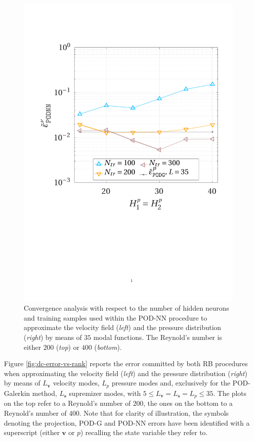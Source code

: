 \documentclass[longtitle]{elsarticle}
\numberwithin{equation}{section}
\theoremstyle{theorem}
\theoremstyle{definition}
\theoremstyle{remark}
\theoremstyle{proposition}
\numberwithin{figure}{section}
\newcommand{\bg}[1]{\boldsymbol{#1}}
\begin{document}
\begin{figure}[h!]
			\includegraphics[scale = 0.37, trim = {1cm 9cm 1.5cm 3.5cm}, clip]{dc_400_p_nn_convergence}
			
			\vspace*{-0.1cm}
			
			\caption{Convergence analysis with respect to the number of hidden neurons and training samples used within the POD-NN procedure to approximate the velocity field (\emph{left}) and the pressure distribution (\emph{right}) by means of $35$ modal functions. The Reynold's number is either $200$ (\emph{top}) or $400$ (\emph{bottom}).}
			\label{fig:dc-nn-convergence}
		\end{figure}

		Figure \ref{fig:dc-error-vs-rank} reports the error committed by both RB procedures when approximating the velocity field (\emph{left}) and the pressure distribution (\emph{right}) by means of $L_{\bg{v}}$ velocity modes, $L_p$ pressure modes and, exclusively for the POD-Galerkin method, $L_{\bg{s}}$ supremizer modes, with $5 \leq L_{\bg{v}} = L_{\bg{s}} = L_p \leq 35$. The plots on the top refer to a Reynold's number of $200$, the ones on the bottom to a Reynold's number of $400$. Note that for clarity of illustration, the symbols denoting the projection, POD-G and POD-NN errors have been identified with a superscript (either $\bg{v}$ or $p$) recalling the state variable they refer to. 
\end{document}

